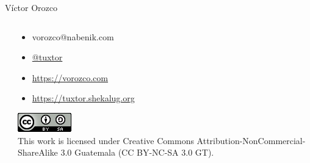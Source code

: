 \documentclass[aspectratio=169]{beamer}
\begin{document}
\begin{frame}{Víctor Orozco}
\begin{columns}[T]
\begin{column}[T]{4cm}
		\end{column}
		\begin{column}[T]{6cm} %
			\begin{itemize}
				\item vorozco@nabenik.com
				\item \href{https://twitter.com/tuxtor}{@tuxtor}
				\item \href{https://vorozco.com}{https://vorozco.com}
				\item \href{https://tuxtor.shekalug.org}{https://tuxtor.shekalug.org}
			\end{itemize}
			\begin{center}
				\includegraphics[width=0.1\linewidth]{Images/cclogo}
				\\
				This work is licensed under Creative Commons Attribution-NonCommercial-ShareAlike 3.0 Guatemala (CC BY-NC-SA 3.0 GT).
			\end{center}
		\end{column}
	\end{columns}
\end{frame}
\end{document}
